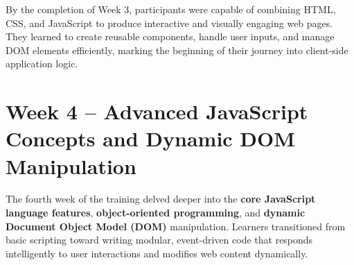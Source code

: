 \documentclass[a4paper,12pt,oneside]{report}
\numberwithin{equation}{chapter}
\numberwithin{figure}{chapter}
\numberwithin{table}{chapter}
\begin{document}
By the completion of Week 3, participants were capable of combining HTML, CSS, and JavaScript to produce interactive and visually engaging web pages. They learned to create reusable components, handle user inputs, and manage DOM elements efficiently, marking the beginning of their journey into client-side application logic.

\vspace{5mm}
\noindent
\section{Week 4 – Advanced JavaScript Concepts and Dynamic DOM Manipulation}

The fourth week of the training delved deeper into the \textbf{core JavaScript language features}, \textbf{object-oriented programming}, and \textbf{dynamic Document Object Model (DOM)} manipulation. Learners transitioned from basic scripting toward writing modular, event-driven code that responds intelligently to user interactions and modifies web content dynamically.
\end{document}
